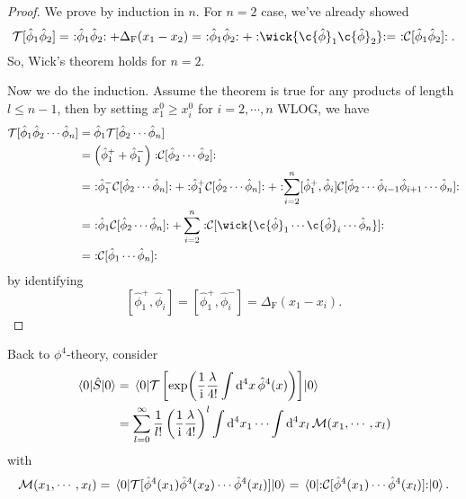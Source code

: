 \documentclass[a4paper,11pt]{article}
\begin{document}
	\begin{proof} 
		We prove by induction in $n$. For $n = 2$ case, we've already showed
		\[
			\mathcal{T}[\hat \phi_1 \hat \phi_2] =\ \nord{\hat \phi_1 \hat \phi_2} + \Delta_\text{F}(x_1 - x_2) =\ \nord{\hat \phi_1 \hat \phi_2} + \nord{\wick{\c{\hat \phi}_1 \c{\hat \phi}_2}} =\ \nord{\mathcal{C}[\hat \phi_1 \hat \phi_2]}.
		\]
		So, Wick's theorem holds for $n=2$.

		Now we do the induction. Assume the theorem is true for any products of length $l \leq n - 1$, then by setting $x_1^0 \geq x^0_i$ for $i = 2, \cdots, n$ WLOG, we have
		\begin{align*}
			\mathcal{T}[\hat \phi_1 \hat \phi_2 \cdots \hat \phi_n] & = \hat \phi_1 \mathcal{T}[\hat \phi_2 \cdots \hat \phi_n]\\
			& = \left( \hat \phi_1^+ + \hat \phi_1^- \right) \nord{\mathcal{C}[\hat \phi_2 \cdots \hat \phi_2]}\\
			& =\ \nord{\hat \phi_1^- \mathcal{C}[\hat \phi_2 \cdots \hat \phi_n]} + \nord{\hat \phi_1^+ \mathcal{C}[\hat \phi_2\cdots \hat \phi_n]} + \nord{\sum _{i = 2}^n [\hat \phi_1^+ , \hat \phi_i] \mathcal{C}[\hat \phi_2 \cdots \hat \phi _{i-1}\hat \phi _{i+1}\cdots \hat \phi_n]}\\
			& =\ \nord{\hat \phi_1 \mathcal{C}[\hat \phi_2 \cdots \hat \phi_n]} + \sum _{i = 2}^n \nord{\mathcal{C}[\wick{\c {\hat \phi}_1 \cdots \c {\hat \phi}_i \cdots \hat \phi_n}]}\\
			& =\ \nord{\mathcal{C}[\hat \phi_1 \cdots \hat \phi_n]}
		\end{align*}
		by identifying
		\[
			[\hat \phi_1^+ , \hat \phi_i] = [\hat \phi_1^+, \hat \phi_i^-] = \Delta_\text{F}(x_1 - x_i).
		\]
	\end{proof}

	Back to $\phi^4$-theory, consider
	\begin{align*}
		\mel{0}{\hat S}{0} & = \mel{0}{\mathcal{T}\left[ \exp(\frac{1}{\mathrm{i}}\frac{\lambda}{4!}\int \dd[4]{x}\hat \phi^4(x)) \right]}{0}\\
		& = \sum _{l=0}^{\infty} \frac{1}{l!} \left( \frac{1}{\mathrm{i}} \frac{\lambda}{4!} \right)^l \int \dd[4]{x_1} \cdots \int \dd[4]{x_l} \mathcal{M}(x_1, \cdots, x_l)
	\end{align*}
	with
	\[
		\mathcal{M}(x_1,\cdots,x_l) = \mel{0}{\mathcal{T}[\hat \phi^4(x_1)\hat \phi^4(x_2)\cdots \hat \phi^4(x_l)]}{0} = \mel{0}{:\mathrel{\mathcal{C}[\hat \phi^4(x_1)\cdots \hat \phi^4(x_l)]}:}{0}.
	\]
	
\end{document}
